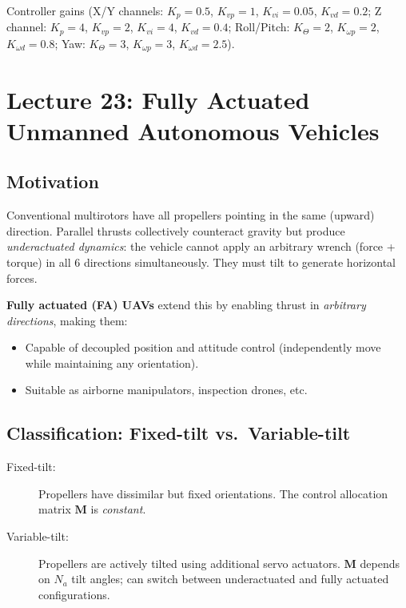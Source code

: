 \documentclass[11pt,a4paper]{article}
\begin{document}
Controller gains (X/Y channels: $K_p=0.5$, $K_{vp}=1$, $K_{vi}=0.05$, $K_{vd}=0.2$; Z channel: $K_p=4$, $K_{vp}=2$, $K_{vi}=4$, $K_{vd}=0.4$; Roll/Pitch: $K_\Theta=2$, $K_{\omega p}=2$, $K_{\omega d}=0.8$; Yaw: $K_\Theta=3$, $K_{\omega p}=3$, $K_{\omega d}=2.5$).

\newpage
\section{Lecture 23: Fully Actuated Unmanned Autonomous Vehicles}

\subsection{Motivation}

Conventional multirotors have all propellers pointing in the same (upward) direction. Parallel thrusts collectively counteract gravity but produce \emph{underactuated dynamics}: the vehicle cannot apply an arbitrary wrench (force + torque) in all 6 directions simultaneously. They must tilt to generate horizontal forces.

\textbf{Fully actuated (FA) UAVs} extend this by enabling thrust in \emph{arbitrary directions}, making them:
\begin{itemize}
  \item Capable of decoupled position and attitude control (independently move while maintaining any orientation).
  \item Suitable as airborne manipulators, inspection drones, etc.
\end{itemize}

\subsection{Classification: Fixed-tilt vs.\ Variable-tilt}

\begin{description}
  \item[Fixed-tilt:] Propellers have dissimilar but fixed orientations.
    The control allocation matrix $\mathbf{M}$ is \emph{constant}.
  \item[Variable-tilt:] Propellers are actively tilted using additional servo actuators.
    $\mathbf{M}$ depends on $N_a$ tilt angles; can switch between underactuated and fully actuated configurations.
\end{description}
\end{document}

